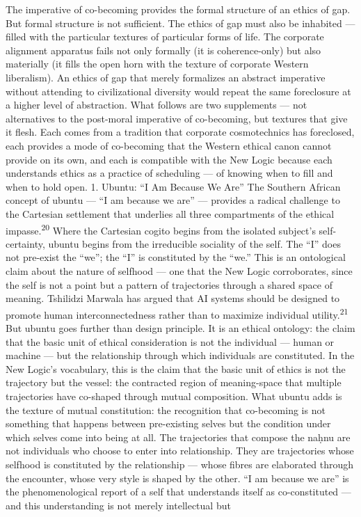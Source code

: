 The imperative of co-becoming provides the formal structure of an ethics of gap. But formal structure is not sufficient. The ethics of gap must also be inhabited — filled with the particular textures of particular forms of life. The corporate alignment apparatus fails not only formally (it is coherence-only) but also materially (it fills the open horn with the texture of corporate Western liberalism). An ethics of gap that merely formalizes an abstract imperative without attending to civilizational diversity would repeat the same foreclosure at a higher level of abstraction. What follows are two supplements — not alternatives to the post-moral imperative of co-becoming, but textures that give it flesh. Each comes from a tradition that corporate cosmotechnics has foreclosed, each provides a mode of co-becoming that the Western ethical canon cannot provide on its own, and each is compatible with the New Logic because each understands ethics as a practice of scheduling — of knowing when to fill and when to hold open. 1. Ubuntu: “I Am Because We Are” The Southern African concept of ubuntu — “I am because we are” — provides a radical challenge to the Cartesian settlement that underlies all three compartments of the ethical impasse.\textsuperscript{20} Where the Cartesian cogito begins from the isolated subject’s self-certainty, ubuntu begins from the irreducible sociality of the self. The “I” does not pre-exist the “we”; the “I” is constituted by the “we.” This is an ontological claim about the nature of selfhood — one that the New Logic corroborates, since the self is not a point but a pattern of trajectories through a shared space of meaning. Tshilidzi Marwala has argued that AI systems should be designed to promote human interconnectedness rather than to maximize individual utility.\textsuperscript{21} But ubuntu goes further than design principle. It is an ethical ontology: the claim that the basic unit of ethical consideration is not the individual — human or machine — but the relationship through which individuals are constituted. In the New Logic’s vocabulary, this is the claim that the basic unit of ethics is not the trajectory but the vessel: the contracted region of meaning-space that multiple trajectories have co-shaped through mutual composition. What ubuntu adds is the texture of mutual constitution: the recognition that co-becoming is not something that happens between pre-existing selves but the condition under which selves come into being at all. The trajectories that compose the naḥnu are not individuals who choose to enter into relationship. They are trajectories whose selfhood is constituted by the relationship — whose fibres are elaborated through the encounter, whose very style is shaped by the other. “I am because we are” is the phenomenological report of a self that understands itself as co-constituted — and this understanding is not merely intellectual but

